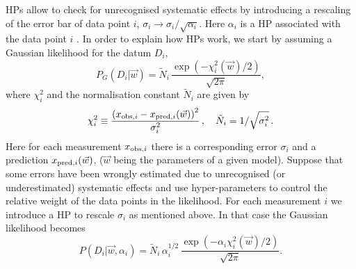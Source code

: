 HPs allow to check for unrecognised systematic effects by introducing a rescaling of the error bar of data point $i$, $\sigma_i \rightarrow \sigma_i/\sqrt{\alpha_i}$. Here $\alpha_i$ is a HP associated with the data point $i$ \cite{Lahav:1999hu}.
In order to explain how HPs work, we start by assuming a Gaussian likelihood for the datum $D_i$,
\begin{equation}\label{Eq:Gaussian-likelihood}
P_G(D_i|\vec{w}) = \tilde{N}_i \, \frac{\exp(-\chi^2_i(\vec{w})/2)}{\sqrt{2\pi}},
\end{equation}
where $\chi^2_i$ and the normalisation constant $\tilde{N}_i$ are given by
\begin{equation}\label{Eq:chi2} %
\chi^2_i \equiv \frac{\left( x_{\obs,i} - x_{\pred,i}(\vec{w}) \right)^2}{\sigma_i^2} \, , \quad
\tilde{N}_i = 1/\sqrt{\sigma_i^2} \, .
\end{equation}
Here for each measurement $x_{\mathrm{obs},i}$ there is a corresponding error $\sigma_i$ and a prediction $x_{\mathrm{pred},i}(\vec{w})$, ($\vec{w}$ being the parameters of a given model). Suppose that some errors have been wrongly estimated due to unrecognised (or underestimated) systematic effects and use hyper-parameters  \cite{Lahav:1999hu} to control the relative weight of the data points in the likelihood. For each measurement {$i$} we introduce a HP to rescale $\sigma_i$ as mentioned above. In that case the Gaussian likelihood becomes \cite{Lahav:1999hu}
\begin{equation}\label{Eq:HP-Gaussian-likelihood}
P(D_i|\vec{w},\alpha_i) = \tilde{N}_i \, \alpha_i^{1/2}\, \frac{\exp(-\alpha_i \chi^2_i(\vec{w})/2)}{\sqrt{2\pi}}.
\end{equation}

